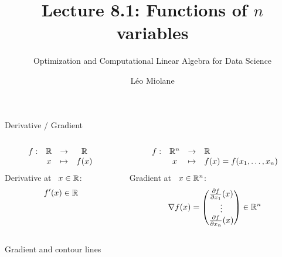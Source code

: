 \documentclass{beamer}
\title{Lecture 8.1: Functions of $n$ variables}
\subtitle{Optimization and Computational Linear Algebra for Data Science}
\author{Léo Miolane}
\date{}
\begin{document}
\setcounter{showProgressBar}{0}
\setcounter{showSlideNumbers}{0}

\frame{\titlepage}
\setcounter{framenumber}{0}
\setcounter{showSlideNumbers}{1}


\begin{frame}[t]{Derivative / Gradient}
	\grid 

	\begin{columns}
		\begin{column}{0.47\textwidth}
			\vspace{-0.5cm}
			$$
			\begin{array}{cccc}
				f: & \R & \to & \R \\
				   & x & \mapsto & f(x)
			\end{array}
			\vspace{0.15cm}
			$$
			Derivative at \ $x \in \mathbb{R}$:
			\vspace{0.35cm}
			$$
			f'(x) \in \mathbb{R}
			$$

	\end{column}
	\hspace{-1cm}
	\vrule
	\hspace{0.5cm}
	\begin{column}{0.53\textwidth}
			$$
			\begin{array}{cccl}
				f: & \mathbb{R}^n & \to & \mathbb{R} \\
				   & x & \mapsto & f(x) = f(x_1, \dots, x_n)
			\end{array}
			$$
			Gradient at \ $x \in \mathbb{R}^n$:
			$$
			\nabla f(x) = 
			\begin{pmatrix}
				\frac{\partial f}{\partial x_1}(x) \\
				\vdots \\
				\frac{\partial f}{\partial x_n}(x)
			\end{pmatrix}
			\in \mathbb{R}^n
			$$
	\end{column}
	\end{columns}

\end{frame}

\begin{frame}[t]{Gradient and contour lines}
	\grid


\end{frame}
\end{document}
